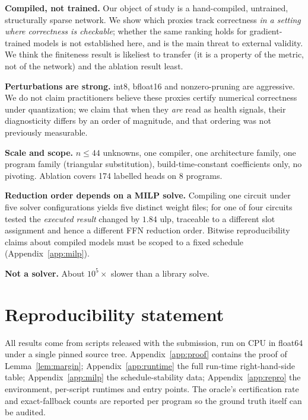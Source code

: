 \documentclass{article}
\theoremstyle{definition}
\begin{document}
\textbf{Compiled, not trained.} Our object of study is a hand-compiled, untrained,
structurally sparse network. We show which proxies track correctness \emph{in a
setting where correctness is checkable}; whether the same ranking holds for
gradient-trained models is not established here, and is the main threat to
external validity. We think the finiteness result is likeliest to transfer (it is
a property of the metric, not of the network) and the ablation result least.

\textbf{Perturbations are strong.} int8, bfloat16 and nonzero-pruning are
aggressive. We do not claim practitioners believe these proxies certify numerical
correctness under quantization; we claim that when they \emph{are} read as health
signals, their diagnosticity differs by an order of magnitude, and that ordering
was not previously measurable.

\textbf{Scale and scope.} $n\le 44$ unknowns, one compiler, one architecture
family, one program family (triangular substitution), build-time-constant
coefficients only, no pivoting. Ablation covers 174 labelled heads on 8 programs.

\textbf{Reduction order depends on a MILP solve.} Compiling one circuit under
five solver configurations yields five distinct weight files; for one of four
circuits tested the \emph{executed result} changed by $1.84$ ulp, traceable to a
different slot assignment and hence a different FFN reduction order. Bitwise
reproducibility claims about compiled models must be scoped to a fixed schedule
(Appendix~\ref{app:milp}).

\textbf{Not a solver.} About $10^5\times$ slower than a library solve.

\section*{Reproducibility statement}

All results come from scripts released with the submission, run on CPU in
float64 under a single pinned source tree. Appendix~\ref{app:proof} contains the
proof of Lemma~\ref{lem:margin}; Appendix~\ref{app:runtime} the full run-time
right-hand-side table; Appendix~\ref{app:milp} the schedule-stability data;
Appendix~\ref{app:repro} the environment, per-script runtimes and entry points.
The oracle's certification rate and exact-fallback counts are reported per
program so the ground truth itself can be audited.
\end{document}
